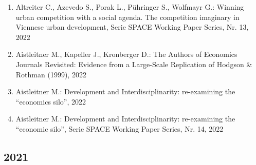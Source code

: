 \begin{enumerate}
	 \item Altreiter C., Azevedo S., Porak L., Pühringer S., Wolfmayr G.: Winning urban competition with a social agenda. The competition imaginary in Viennese urban development, Serie SPACE Working Paper Series, Nr. 13, 2022
	 \item Aistleitner M., Kapeller J., Kronberger D.: The Authors of Economics Journals Revisited: Evidence from a Large-Scale Replication of Hodgson & Rothman (1999), 2022
	 \item Aistleitner M.: Development and Interdisciplinarity: re-examining the “economics silo”, 2022
	 \item Aistleitner M.: Development and Interdisciplinarity: re-examining the “economic silo”, Serie SPACE Working Paper Series, Nr. 14, 2022
\end{enumerate}
\subsection*{2021}
